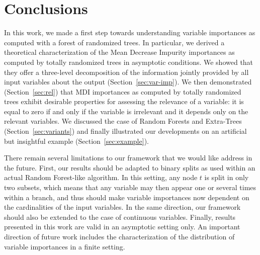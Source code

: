 \documentclass{article}
\begin{document}

\section{Conclusions}
\label{sec:conclusions}

In this work, we made a first step towards understanding variable importances as
computed with a forest of randomized trees. In particular, we derived a
theoretical characterization of the Mean Decrease Impurity importances as
computed by totally randomized trees in asymptotic  conditions.  We showed that
they offer a three-level decomposition of the information jointly provided by
all input variables about the output (Section~\ref{sec:var-imp}). We then demonstrated
(Section~\ref{sec:rel}) that MDI importances as computed by totally randomized
trees exhibit desirable properties for  assessing the relevance of a variable:
it is equal to zero if and only if the variable is irrelevant and it depends
only on the relevant variables. We discussed the case of Random Forests and
Extra-Trees (Section~\ref{sec:variants}) and finally illustrated our
developments on an artificial but insightful example (Section~\ref{sec:example}).

There remain several limitations to our framework that we would like address in
the future. First, our results should be adapted to binary splits as used within
an actual Random Forest-like algorithm. In this setting, any node $t$ is split
in only two subsets, which means that any variable may then appear one or
several times within a branch, and thus should make variable importances now
dependent on the cardinalities of the input variables. In the same direction,
our framework should also be extended to the case of continuous variables.
Finally, results presented in this work are valid in an asymptotic setting only.
An important direction of future work includes the characterization of the
distribution of variable importances in a finite setting.


\medskip {}



\clearpage


\vfill
\end{document}
